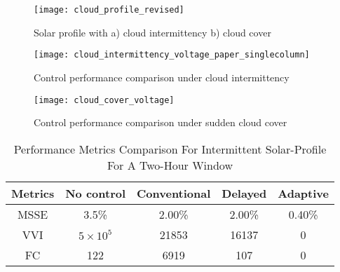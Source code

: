\documentclass[journal]{IEEEtran}
\begin{document}
\begin{figure}
	\centering
	\texttt{[image: cloud\_profile\_revised]}
    \vspace{-0.5em}
    \caption {Solar profile with a) cloud intermittency b) cloud cover}
    \label{fig:cloud_profile}
    \vspace{-0.1mm}
\end{figure}

\begin{figure}
	\centering
    	\texttt{[image: cloud\_intermittency\_voltage\_paper\_singlecolumn]}
    \vspace{-1.9em}
    \caption {Control performance comparison under cloud intermittency}
    \label{fig:cloud_intermittent_voltage}
     \vspace{0.5em}
     
    \texttt{[image: cloud\_cover\_voltage]}
    \vspace{-1.5em}
    \caption {Control performance comparison under sudden cloud cover}
    \label{fig:cloud_cover_voltage}
    \vspace{-0.8em}
\end{figure}

\begin{table}
\vspace{-0.5em}
\caption{Performance Metrics Comparison For Intermittent Solar-Profile For A Two-Hour Window}
\vspace{-1em}
\label{tab:cloud_intermittent}
\begin{center}
\renewcommand{\arraystretch}{1.2}
\begin{tabular}{|c|c|c|c|c|}
\hline
Metrics & No control & Conventional & Delayed  & Adaptive\\
\hline
MSSE & 3.5\% & 2.00\% & 2.00\% & 0.40\%\\
VVI & $5\times 10^5$ & 21853 & 16137 & 0\\
FC & 122 & 6919 & 107 & 0\\
\hline
\end{tabular}
\end{center}
\end{table}
\end{document}
